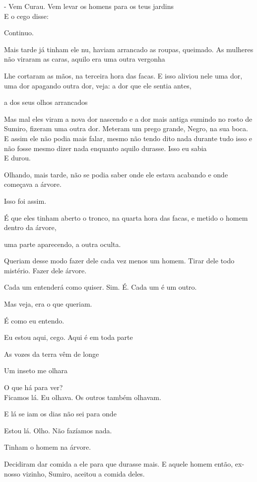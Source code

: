- Vem Curau. Vem levar os homens para os teus jardins\\

E o cego disse:

Continuo.

Mais tarde já tinham ele nu, haviam arrancado as roupas, queimado. As
mulheres não viraram as caras, aquilo era uma outra vergonha

Lhe cortaram as mãos, na terceira hora das facas. E isso aliviou nele
uma dor, uma dor apagando outra dor, veja: a dor que ele sentia antes,

a dos seus olhos arrancados

Mas mal eles viram a nova dor nascendo e a dor mais antiga sumindo no
rosto de Sumiro, fizeram uma outra dor. Meteram um prego grande, Negro,
na sua boca. E assim ele não podia mais falar, mesmo não tendo dito nada
durante tudo isso e não fosse mesmo dizer nada enquanto aquilo durasse.
Isso eu sabia\\

E durou.

Olhando, mais tarde, não se podia saber onde ele estava acabando e onde
começava a árvore.

Isso foi assim.

É que eles tinham aberto o tronco, na quarta hora das facas, e metido o
homem dentro da árvore,

uma parte aparecendo, a outra oculta.

Queriam desse modo fazer dele cada vez menos um homem. Tirar dele todo
mistério. Fazer dele árvore.

Cada um entenderá como quiser. Sim. É. Cada um é um outro.

Mas veja, era o que queriam.

É como eu entendo.

Eu estou aqui, cego. Aqui é em toda parte

As vozes da terra vêm de longe

Um inseto me olhara

O que há para ver?\\

Ficamos lá. Eu olhava. Os outros também olhavam.

E lá se iam os dias não sei para onde

Estou lá. Olho. Não fazíamos nada.

Tinham o homem na árvore.

Decidiram dar comida a ele para que durasse mais. E aquele homem então,
ex-nosso vizinho, Sumiro, aceitou a comida deles.

